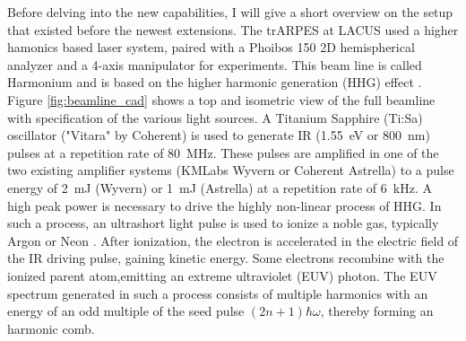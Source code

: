 Before delving into the new capabilities, I will give a short overview on the setup that existed before the newest extensions.
The trARPES at LACUS used a higher hamonics based laser system, paired with a Phoibos 150 2D hemispherical analyzer and a 4-axis manipulator for experiments.
This beam line is called Harmonium and is based on the higher harmonic generation (HHG) effect \cite{arrell_harmonium_2017}.
Figure \ref{fig:beamline_cad} shows a top and isometric view of the full beamline with specification of the various light sources.
A Titanium Sapphire (Ti:Sa) oscillator ("Vitara" by Coherent) is used to generate IR (\qty{1.55}{\electronvolt} or \qty{800}{\nano\meter}) pulses at a repetition rate of \qty{80}{\mega\hertz}.
These pulses are amplified in one of the two existing amplifier systems (KMLabs Wyvern or Coherent Astrella) to a pulse energy of \qty{2}{\milli\joule} (Wyvern) or \qty{1}{\milli\joule} (Astrella) at a repetition rate of \qty{6}{\kilo\hertz}.
A high peak power is necessary to drive the highly non-linear process of HHG.
In such a process, an ultrashort light pulse is used to ionize a noble gas, typically Argon or Neon \cite{rudawski_high-flux_2013}.
After ionization, the electron is accelerated in the electric field of the IR driving pulse, gaining kinetic energy.
Some electrons recombine with the ionized parent atom,emitting an extreme ultraviolet (EUV) photon.
The EUV spectrum generated in such a process consists of multiple harmonics with an energy of an odd multiple of the seed pulse $(2n+1) \hbar\omega$, thereby forming an harmonic comb.

